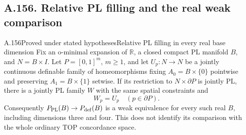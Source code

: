 \subsection{A.156. Relative PL filling and the real weak comparison}

\begin{saresult}{A.156}{Proved under stated hypotheses}{Relative PL filling in every real base dimension}
Fix an o-minimal expansion of $\mathbb R$, a closed compact PL
manifold $B$, and $N=B\times I$. Let $P=[0,1]^m$, $m\ge1$,
and let $U_p:N\to N$ be a jointly continuous definable family
of homeomorphisms fixing $A_0=B\times\{0\}$ pointwise and
preserving $A_1=B\times\{1\}$ setwise. If its restriction to
$N\times\partial P$ is jointly PL, there is a jointly PL
family $W$ with the same spatial constraints and
\[
 W_p=U_p\quad(p\in\partial P).
 \tag{156.1}
\]
Consequently $P_{\rm PL}(B)\to P_{\rm def}(B)$ is a weak
equivalence for every such real $B$, including dimensions
three and four. This does not identify its comparison with
the whole ordinary TOP concordance space.
\end{saresult}

